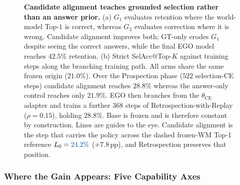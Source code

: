 \documentclass[letterpaper]{article}
\newcommand{\obs}[1]{\textcolor{measuredblue}{#1}}
\newcommand{\pp}{\,\mathrm{pp}}
\newcommand{\method}{\textsc{EGO}}
\begin{document}
\begin{figure}[t]
{
}
\caption{\textbf{Candidate alignment teaches grounded selection rather than
an answer prior.}  (a) $G_1$ evaluates retention where the world-model
Top-\obs{$1$} is correct, whereas $G_2$ evaluates correction where it is
wrong.  Candidate alignment improves both; GT-only erodes $G_1$ despite
seeing the correct answers, while the final \method{} model reaches
\obs{$42.5\%$} retention.  (b) Strict SelAcc@Top-$K$ against training steps
along the branching training path.  All arms share the same frozen origin
(\obs{$21.0\%$}).  Over the Prospection phase (\obs{$522$} selection-CE
steps) candidate alignment reaches \obs{$28.8\%$} whereas the answer-only
control reaches only \obs{$21.9\%$}.  \method{} then branches from the
$\theta_{\mathrm{CE}}$ adapter and trains a further \obs{$368$} steps of
Retrospection-with-Replay ($\rho{=}0.15$), holding \obs{$28.8\%$}.  Base is
frozen and is therefore constant by construction.  Lines are guides to the
eye.  Candidate alignment is the step that carries the policy across the
dashed frozen-WM Top-1 reference $L_0=\obs{24.2\%}$
(\obs{$+7.8\pp$}), and Retrospection preserves that position.}
\label{fig:capability}
\end{figure}

\subsubsection{Where the Gain Appears: Five Capability Axes}
\label{sec:er-axes}
\end{document}
